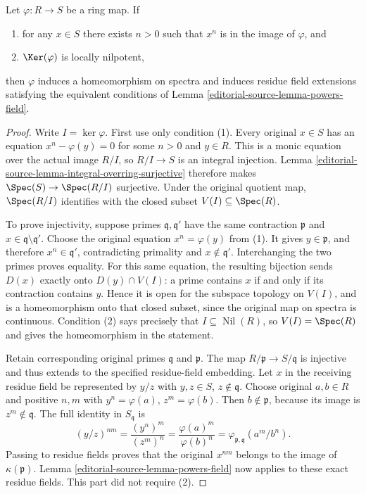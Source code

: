 \begin{lemma}
\label{editorial-source-lemma-powers}
Let $\varphi : R \to S$ be a ring map. If
\begin{enumerate}
\item for any $x \in S$ there exists $n > 0$ such that
$x^n$ is in the image of $\varphi$, and
\item $\Ker(\varphi)$ is locally nilpotent,
\end{enumerate}
then $\varphi$ induces a homeomorphism on spectra and induces residue
field extensions satisfying the equivalent conditions of
Lemma \ref{editorial-source-lemma-powers-field}.
\end{lemma}

\begin{proof}
Write $I=\ker\varphi$. First use only
condition (1). Every original $x\in S$
has an equation $x^n-\varphi(y)=0$
for some $n>0$ and $y\in R$. This is
a monic equation over the actual image
$R/I$, so $R/I\to S$ is an integral
injection. Lemma
\ref{editorial-source-lemma-integral-overring-surjective}
therefore makes $\Spec(S)\to\Spec(R/I)$
surjective. Under the original quotient
map, $\Spec(R/I)$ identifies with
the closed subset $V(I)\subseteq\Spec(R)$.

To prove injectivity, suppose primes
$\mathfrak q,\mathfrak q'$ have the
same contraction $\mathfrak p$ and
$x\in\mathfrak q\setminus\mathfrak q'$.
Choose the original equation
$x^n=\varphi(y)$ from (1). It gives
$y\in\mathfrak p$, and therefore
$x^n\in\mathfrak q'$, contradicting
primality and $x\notin\mathfrak q'$.
Interchanging the two primes proves
equality. For this same equation,
the resulting bijection sends $D(x)$
exactly onto $D(y)\cap V(I)$: a prime
contains $x$ if and only if its
contraction contains $y$. Hence it
is open for the subspace topology
on $V(I)$, and is a homeomorphism
onto that closed subset, since the
original map on spectra is continuous.
Condition (2) says precisely that
$I\subseteq\operatorname{Nil}(R)$,
so $V(I)=\Spec(R)$ and gives the
homeomorphism in the statement.

Retain corresponding original primes
$\mathfrak q$ and $\mathfrak p$.
The map $R/\mathfrak p\to S/\mathfrak q$
is injective and thus extends to the
specified residue-field embedding.
Let $x$ in the receiving residue
field be represented by $y/z$ with
$y,z\in S$, $z\notin\mathfrak q$.
Choose original $a,b\in R$ and
positive $n,m$ with
$y^n=\varphi(a)$, $z^m=\varphi(b)$.
Then $b\notin\mathfrak p$, because
its image is $z^m\notin\mathfrak q$.
The full identity in $S_{\mathfrak q}$ is
$$
(y/z)^{nm}
=\frac{(y^n)^m}{(z^m)^n}
=\frac{\varphi(a)^m}{\varphi(b)^n}
=\varphi_{\mathfrak p,\mathfrak q}(a^m/b^n).
$$
Passing to residue fields proves
that the original $x^{nm}$ belongs
to the image of $\kappa(\mathfrak p)$.
Lemma \ref{editorial-source-lemma-powers-field} now
applies to these exact residue fields.
This part did not require (2).


\end{proof}

